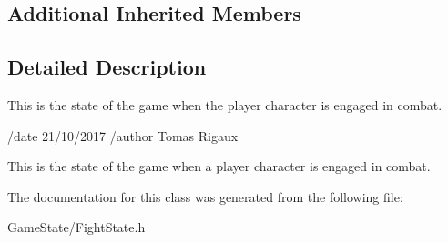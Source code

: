 \subsection*{Additional Inherited Members}


\subsection{Detailed Description}
This is the state of the game when the player character is engaged in combat. 

/date 21/10/2017 /author Tomas Rigaux

This is the state of the game when a player character is engaged in combat. 

The documentation for this class was generated from the following file\-:\begin{DoxyCompactItemize}
\item 
Game\-State/Fight\-State.\-h\end{DoxyCompactItemize}
